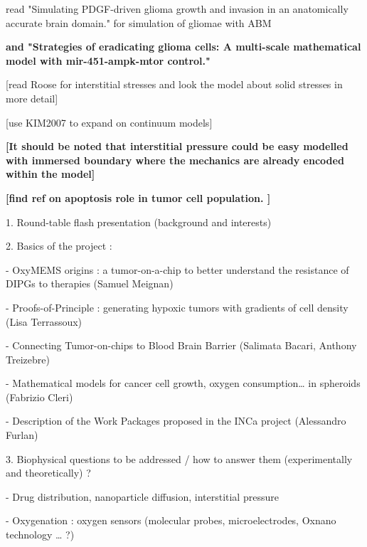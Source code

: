 \documentclass[11pt,a4paper]{article}
\begin{document}
read "Simulating PDGF-driven glioma growth and invasion in an anatomically accurate brain domain." for simulation of gliomae with ABM

\textbf{and "Strategies of eradicating glioma cells: A multi-scale mathematical model with mir-451-ampk-mtor control."}

[read Roose for interstitial stresses and look the model about solid stresses in more detail]

[use KIM2007 to expand on continuum models]

\textbf{[It should be noted that interstitial pressure could be easy modelled with immersed boundary where the mechanics are already encoded within the model]}


\textbf{[find ref on apoptosis role in tumor cell population. ]}





1.      Round-table flash presentation (background and interests)

2.      Basics of the project :

-        OxyMEMS origins : a tumor-on-a-chip to better understand the resistance of DIPGs to therapies (Samuel Meignan) 

-        Proofs-of-Principle : generating hypoxic tumors with gradients of cell density (Lisa Terrassoux) 

-        Connecting Tumor-on-chips to Blood Brain Barrier (Salimata Bacari, Anthony Treizebre)

-        Mathematical models for cancer cell growth, oxygen consumption… in spheroids (Fabrizio Cleri) 

-        Description of the Work Packages proposed in the INCa project (Alessandro Furlan)

3.      Biophysical questions to be addressed / how to answer them (experimentally and theoretically) ?

-        Drug distribution, nanoparticle diffusion, interstitial pressure

-        Oxygenation : oxygen sensors (molecular probes, microelectrodes, Oxnano technology … ?)
\end{document}

